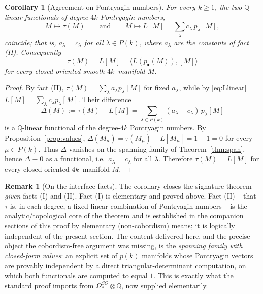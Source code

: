 \documentclass[12pt]{article}
\newtheorem{corollary}{Corollary}
\theoremstyle{definition}
\newtheorem{remark}{Remark}
\begin{document}
\begin{corollary}[Agreement on Pontryagin numbers]\label{cor:agree}
For every $k\ge 1$, the two $\mathbb{Q}$-linear functionals of degree-$4k$ Pontryagin
numbers,
\[
M\longmapsto\tau(M)
\qquad\text{and}\qquad
M\longmapsto L[M]=\sum_\lambda c_\lambda\,p_\lambda[M],
\]
coincide; that is, $a_\lambda=c_\lambda$ for all $\lambda\in P(k)$, where $a_\lambda$ are
the constants of fact \textnormal{(II)}.  Consequently
\[
\tau(M)=L[M]=\big\langle L(p_\bullet(M)),[M]\big\rangle
\]
for every closed oriented smooth $4k$--manifold $M$.
\end{corollary}

\begin{proof}
By fact (II), $\tau(M)=\sum_\lambda a_\lambda p_\lambda[M]$ for fixed $a_\lambda$, while by
\eqref{eq:Llinear} $L[M]=\sum_\lambda c_\lambda p_\lambda[M]$.  Their difference
\[
\Delta(M):=\tau(M)-L[M]=\sum_{\lambda\in P(k)}(a_\lambda-c_\lambda)\,p_\lambda[M]
\]
is a $\mathbb{Q}$-linear functional of the degree-$4k$ Pontryagin numbers.  By
Proposition~\ref{prop:values}, $\Delta(M_\mu)=\tau(M_\mu)-L[M_\mu]=1-1=0$ for every
$\mu\in P(k)$.  Thus $\Delta$ vanishes on the spanning family of
Theorem~\ref{thm:span}, hence $\Delta\equiv 0$ as a functional, i.e.\
$a_\lambda=c_\lambda$ for all $\lambda$.  Therefore $\tau(M)=L[M]$ for every closed
oriented $4k$--manifold $M$.
\end{proof}

\bigskip

\begin{remark}[On the interface facts]
The corollary closes the signature theorem \emph{given} facts (I) and (II).  Fact (I) is
elementary and proved above.  Fact (II) -- that $\tau$ is, in each degree, a fixed linear
combination of Pontryagin numbers -- is the analytic/topological core of the theorem and
is established in the companion sections of this proof by elementary (non-cobordism)
means; it is logically independent of the present section.  The content delivered here,
and the precise object the cobordism-free argument was missing, is the
\emph{spanning family with closed-form values}: an explicit set of $p(k)$ manifolds whose
Pontryagin vectors are provably independent by a direct triangular-determinant
computation, on which both functionals are computed to equal $1$.  This is exactly what
the standard proof imports from $\Omega^{SO}_\ast\otimes\mathbb{Q}$, now supplied
elementarily.
\end{remark}
\end{document}
